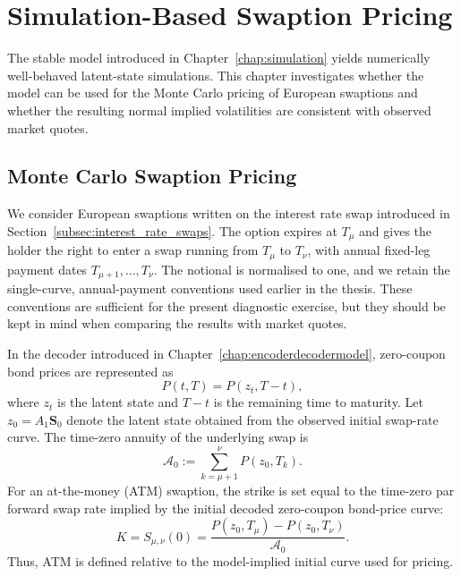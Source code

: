 \chapter{Simulation-Based Swaption Pricing}
\label{chap:pricing_methodology}

The stable model introduced in Chapter~\ref{chap:simulation} yields numerically well-behaved latent-state simulations. This chapter investigates whether the model can be used for the Monte Carlo pricing of European swaptions and whether the resulting normal implied volatilities are consistent with observed market quotes.

\section{Monte Carlo Swaption Pricing}
\label{sec:swaption_pricing_methodology}

We consider European swaptions \citep{Filipovic2009} written on the interest rate swap introduced in Section~\ref{subsec:interest_rate_swaps}. The option expires at \(T_{\mu}\) and gives the holder the right to enter a swap running from \(T_{\mu}\) to \(T_{\nu}\), with annual fixed-leg payment dates \(T_{\mu+1},\ldots,T_{\nu}\). The notional is normalised to one, and we retain the single-curve, annual-payment conventions used earlier in the thesis. These conventions are sufficient for the present diagnostic exercise, but they should be kept in mind when comparing the results with market quotes.

In the decoder introduced in Chapter~\ref{chap:encoderdecodermodel}, zero-coupon bond prices are represented as
\[
P(t,T)=P(z_t,T-t),
\]
where \(z_t\) is the latent state and \(T-t\) is the remaining time to maturity. Let \(z_0=A_1\mathbf S_0\) denote the latent state obtained from the observed initial swap-rate curve. The time-zero annuity of the underlying swap is
\[
\mathcal A_0
:=
\sum_{k=\mu+1}^{\nu} P(z_0,T_k).
\]
For an at-the-money (ATM) swaption, the strike is set equal to the time-zero par forward swap rate implied by the initial decoded zero-coupon bond-price curve:
\begin{equation}
K
=
S_{\mu,\nu}(0)
=
\frac{
P(z_0,T_{\mu})-P(z_0,T_{\nu})
}{
\mathcal A_0
}.
\label{eq:atm_swaption_strike}
\end{equation}
Thus, ATM is defined relative to the model-implied initial curve used for pricing.

